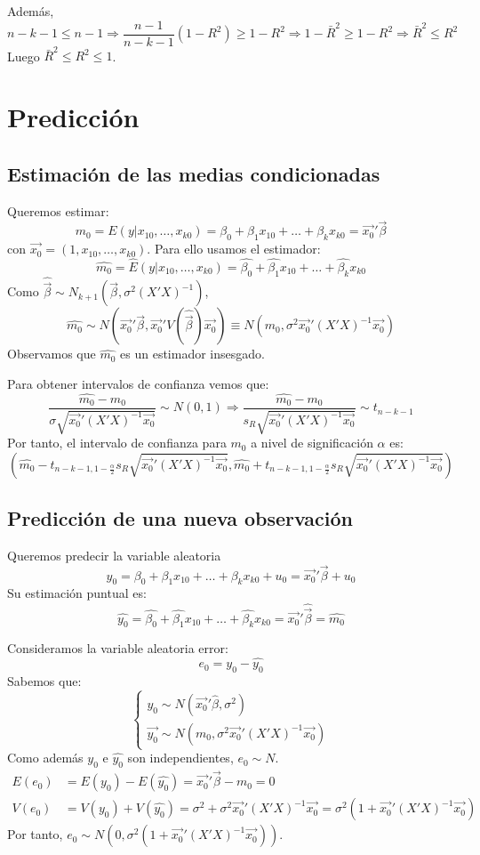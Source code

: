 \documentclass{report}
\theoremstyle{remark}
\theoremstyle{remark}
\theoremstyle{remark}
\theoremstyle{definition}
\theoremstyle{definition}
\theoremstyle{definition}
\begin{document}
Además,
$$n-k-1 \leq n-1 \Rightarrow \frac{n-1}{n-k-1}(1-R^2) \geq 1 - R^2 \Rightarrow 1-\bar{R}^2 \geq 1-R^2 \Rightarrow \bar{R}^2 \leq R^2$$
Luego $\bar{R}^2 \leq R^2 \leq 1$.

\section{Predicción}
\subsection*{Estimación de las medias condicionadas}
Queremos estimar:
$$m_0 = E(y|x_{10}, \dots, x_{k0}) = \beta_0 + \beta_1x_{10} + \dots + \beta_kx_{k0} = \vec{x_0}'\vec{\beta}$$
con $\vec{x_0} = (1, x_{10}, \dots, x_{k0})$.
Para ello usamos el estimador:
$$\hat{m_0} = \hat{E}(y|x_{10}, \dots, x_{k0}) = \hat{\beta_0} + \hat{\beta_1}x_{10} + \dots + \hat{\beta_k}x_{k0}$$
Como $\hat{\vec{\beta}} \sim N_{k+1}(\vec{\beta}, \sigma^2(X'X)^{-1})$,
$$\hat{m_0} \sim N(\vec{x_0}'\vec{\beta}, \vec{x_0}'V(\hat{\vec{\beta}})\vec{x_0}) \equiv N(m_0, \sigma^2\vec{x_0}'(X'X)^{-1}\vec{x_0})$$
Observamos  que $\hat{m_0}$ es un estimador insesgado.

Para obtener intervalos de confianza vemos que:
$$\frac{\hat{m_0}-m_0}{\sigma\sqrt{\vec{x_0}'(X'X)^{-1}\vec{x_0}}} \sim N(0, 1) \Rightarrow \frac{\hat{m_0}-m_0}{s_R\sqrt{\vec{x_0}'(X'X)^{-1}\vec{x_0}}} \sim t_{n-k-1}$$
Por tanto, el intervalo de confianza para $m_0$ a nivel de significación $\alpha$ es:
$$\left( \hat{m_0} - t_{n-k-1, 1-\frac{\alpha}{2}} s_R\sqrt{\vec{x_0}'(X'X)^{-1}\vec{x_0}}, \hat{m_0} + t_{n-k-1, 1-\frac{\alpha}{2}} s_R\sqrt{\vec{x_0}'(X'X)^{-1}\vec{x_0}} \right)$$

\subsection*{Predicción de una nueva observación}
Queremos predecir la variable aleatoria
$$y_0 = \beta_0 + \beta_1x_{10} + \dots + \beta_kx_{k0} + u_0 = \vec{x_0}'\vec{\beta} + u_0$$
Su estimación puntual es:
$$\hat{y_0} = \hat{\beta_0} + \hat{\beta_1}x_{10} + \dots + \hat{\beta_k}x_{k0} = \vec{x_0}'\hat{\vec{\beta}} = \hat{m_0}$$

Consideramos la variable aleatoria error:
$$e_0 = y_0 - \hat{y_0}$$
Sabemos que:
$$\begin{cases}
        y_0 \sim N(\vec{x_0}'\hat{\beta}, \sigma^2) \\
        \vec{y_0} \sim N(m_0, \sigma^2\vec{x_0}'(X'X)^{-1}\vec{x_0})
    \end{cases}$$
Como además $y_0$ e $\hat{y_0}$ son independientes, $e_0 \sim N$.
\begin{align*}
    E(e_0) & = E(y_0) - E(\hat{y_0}) = \vec{x_0}'\vec{\beta} - m_0 = 0                                                                 \\
    V(e_0) & = V(y_0) + V(\hat{y_0}) = \sigma^2 + \sigma^2\vec{x_0}'(X'X)^{-1}\vec{x_0} = \sigma^2 (1 + \vec{x_0}'(X'X)^{-1}\vec{x_0})
\end{align*}
Por tanto, $e_0 \sim N(0, \sigma^2 (1 + \vec{x_0}'(X'X)^{-1}\vec{x_0}))$.
\end{document}
